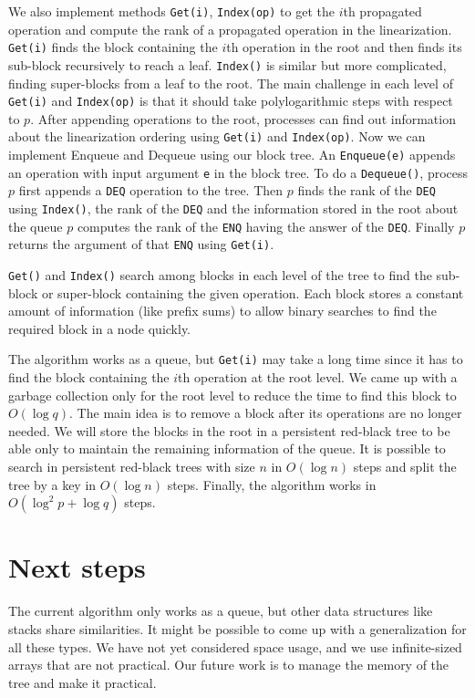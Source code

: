 \documentclass[12pt]{article}
\begin{document}
We also implement methods \texttt{Get(i)}, \texttt{Index(op)} to get the $i$th propagated operation and compute the rank of a propagated operation in the linearization. \texttt{Get(i)} finds the block containing the $i$th operation in the root and then finds its sub-block recursively to reach a leaf. \texttt{Index()} is  similar but more complicated, finding super-blocks from a leaf to the root. The main challenge in each level of \texttt{Get(i)} and \texttt{Index(op)} is that it should take polylogarithmic steps with respect to $p$. After appending operations to the root, processes can find out information about the linearization ordering using \texttt{Get(i)} and \texttt{Index(op)}. Now we can implement Enqueue and Dequeue using our block tree. An \texttt{Enqueue(e)} appends an operation with input argument \texttt{e} in the block tree. To do a \texttt{Dequeue()}, process $p$ first appends a \texttt{DEQ} operation to the tree. Then $p$ finds the rank of the \texttt{DEQ} using \texttt{Index()}, the rank of the \texttt{DEQ} and the information stored in the root about the queue $p$ computes the rank of  the \texttt{ENQ} having the answer of the \texttt{DEQ}. Finally $p$ returns the argument of that \texttt{ENQ} using \texttt{Get(i)}.

\texttt{Get()} and \texttt{Index()} search among blocks in each level of the tree to find the sub-block or super-block containing the given operation. Each block stores a constant amount of information (like prefix sums) to allow binary searches to find the required block in a node quickly.

The algorithm works as a queue, but \texttt{Get(i)}  may take a long time since it has to find the block containing the $i$th operation at the root level. We came up with a garbage collection only for the root level to reduce the time to find this block to $O(\log q)$. The main idea is to remove a block after its operations are no longer needed. We will store the blocks in the root in a persistent red-black tree to be able only to maintain the remaining information of the queue. It is possible to search in persistent red-black trees with size $n$ in $O(\log n)$ steps and split the tree by a key in $O(\log n)$ steps.  Finally, the algorithm works in $O(\log^2 p +\log q)$ steps.

\section{Next steps}
The current algorithm only works as a queue, but other data structures like stacks share similarities. It might be possible to come up with a generalization for all these types. We have not yet considered space usage, and we use infinite-sized arrays that are not practical. Our future work is to manage the memory of the tree and make it practical.
\end{document}
